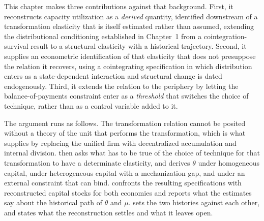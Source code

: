 This chapter makes three contributions against that background. First,
it reconstructs capacity utilization as a \emph{derived} quantity,
identified downstream of a transformation elasticity that is itself
estimated rather than assumed, extending the distributional conditioning
established in Chapter~1 from a cointegration-survival result to a
structural elasticity with a historical trajectory. Second, it supplies
an econometric identification of that elasticity that does not
presuppose the relation it recovers, using a cointegrating
specification in which distribution enters as a state-dependent
interaction and structural change is dated endogenously. Third, it
extends the relation to the periphery by letting the balance-of-payments
constraint enter as a \emph{threshold} that switches the choice of
technique, rather than as a control variable added to it.

The argument runs as follows. The transformation relation cannot be
posited without a theory of the unit that performs the transformation,
which is what  supplies by replacing the
unified firm with decentralized accumulation and internal division.
 then asks what has to be true of the
choice of technique for that transformation to have a determinate
elasticity, and derives $\theta$ under homogeneous capital, under
heterogeneous capital with a mechanization gap, and under an external
constraint that can bind.  confronts the
resulting specifications with reconstructed capital stocks for both
economies and reports what the estimates say about the historical path
of $\theta$ and $\mu$.  sets the two histories
against each other, and  states what the
reconstruction settles and what it leaves open.